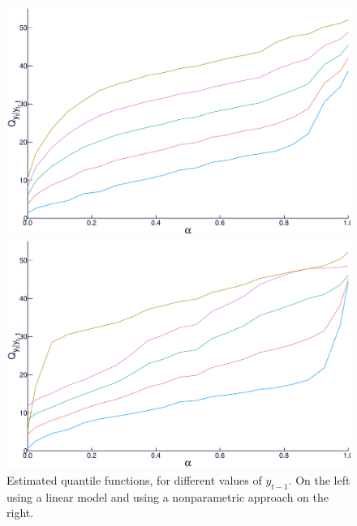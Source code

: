 \begin{figure}
  \centering
  \begin{minipage}[t]{\linewidth}
    \centering
    \begin{minipage}[t]{0.45\linewidth}
      \centering     \includegraphics[width=\textwidth]{../Figuras/regressao-quantilica/icaraizinho-quantile-linear}
    \end{minipage}
    \begin{minipage}[t]{0.45\linewidth}
      \centering     \includegraphics[width=\textwidth]{../Figuras/regressao-quantilica/icaraizinho-quantile-nonpar-lambda30}
    \end{minipage}
  \end{minipage}
  \caption{Estimated quantile functions, for different values of $y_{t-1}$. On the left using a linear model and using a nonparametric approach on the right.}
  \label{fig:quantiles-vs-xt}
\end{figure}

